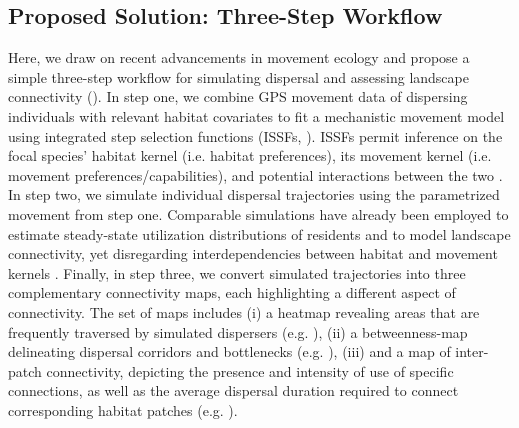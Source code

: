 \documentclass[abstract=on,10pt,a4paper,bibliography=totocnumbered]{article}
\begin{document}
\subsection{Proposed Solution: Three-Step Workflow}
Here, we draw on recent advancements in movement ecology and propose a simple
three-step workflow for simulating dispersal and assessing landscape
connectivity (). In step one, we combine GPS movement
data of dispersing individuals with relevant habitat covariates to fit a
mechanistic movement model using integrated step selection functions (ISSFs,
\citealp{Avgar.2016}). ISSFs permit inference on the focal species' habitat
kernel (i.e. habitat preferences), its movement kernel (i.e. movement
preferences/capabilities), and potential interactions between the two
\citep{Avgar.2016, Fieberg.2021}. In step two, we simulate individual dispersal
trajectories using the parametrized movement from step one. Comparable
simulations have already been employed to estimate steady-state utilization
distributions of residents \citep{Potts.2013, Signer.2017} and to model
landscape connectivity, yet disregarding interdependencies between habitat and
movement kernels \citep{Clark.2015, Zeller.2020}. Finally, in step three, we
convert simulated trajectories into three complementary connectivity maps, each
highlighting a different aspect of connectivity. The set of maps includes (i) a
heatmap revealing areas that are frequently traversed by simulated dispersers
(e.g. \citealp{Hauenstein.2019, Zeller.2020}), (ii) a betweenness-map
delineating dispersal corridors and bottlenecks (e.g.
\citealp{BastilleRousseau.2018}), (iii) and a map of inter-patch connectivity,
depicting the presence and intensity of use of specific connections, as well as
the average dispersal duration required to connect corresponding habitat patches
(e.g. \citealp{Gustafson.1996, Kanagaraj.2013}).

\end{document}
